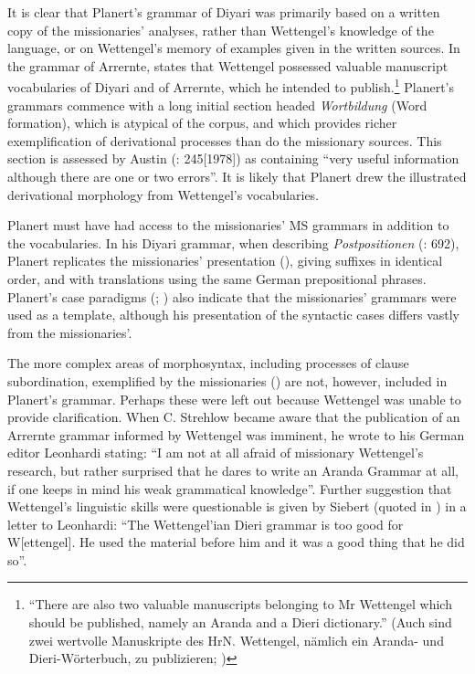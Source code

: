 It is clear that Planert’s grammar of Diyari was primarily based on a written copy of the missionaries' analyses, rather than Wettengel’s knowledge of the language, or on Wettengel’s memory of examples given in the written sources. In the grammar of Arrernte, \citet[551]{planert_australische_1907} states that Wettengel possessed valuable manuscript vocabularies of Diyari and of Arrernte, which he intended to publish.\footnote{“There are also two valuable manuscripts belonging to Mr Wettengel which should be published, namely an Aranda and a Dieri dictionary.” (Auch sind zwei wertvolle Manuskripte des HrN. Wettengel, nämlich ein Aranda- und Dieri-Wörterbuch, zu publizieren; \citealt[551]{planert_australische_1907})} Planert’s grammars commence with a long initial section headed \textit{Wortbildung} (Word formation), which is atypical of the corpus, and which provides richer exemplification of derivational processes than do the missionary sources. This section is assessed by Austin (\citeyear{austin_grammar_2013}: 245[1978]) as containing “very useful information although there are one or two errors”. It is likely that Planert drew the illustrated derivational morphology from Wettengel’s vocabularies.

Planert must have had access to the missionaries' MS grammars in addition to the vocabularies. In his Diyari grammar, when describing \textit{Postpositionen} (\citeyear{planert_australische_1908}: 692), Planert replicates the missionaries' presentation (), giving suffixes in identical order, and with translations using the same German prepositional phrases. Planert’s case paradigms (; ) also indicate that the missionaries' grammars were used as a template, although his presentation of the syntactic cases differs vastly from the missionaries’.

The more complex areas of morphosyntax, including processes of clause subordination, exemplified by the missionaries () are not, however, included in Planert’s grammar. Perhaps these were left out because Wettengel was unable to provide clarification. When C. Strehlow became aware that the publication of an Arrernte grammar informed by Wettengel was imminent, he \citeyearpar{strehlow_aranda-und_1907} wrote to his German editor Leonhardi stating: “I am not at all afraid of missionary Wettengel’s research, but rather surprised that he dares to write an Aranda Grammar at all, if one keeps in mind his weak grammatical knowledge”. Further suggestion that Wettengel’s linguistic skills were questionable is given by Siebert (quoted in \citealt{leonhardi_letter_1909}) in a letter to Leonhardi: “The Wettengel’ian Dieri grammar is too good for W[ettengel]. He used the material before him and it was a good thing that he did so”.

